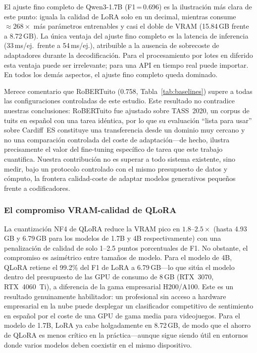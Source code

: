 \documentclass[conference]{IEEEtran}
\begin{document}
El ajuste fino completo de Qwen3-1.7B (F1\,=\,0.696) es la ilustración más clara
de este punto: iguala la calidad de LoRA solo en un decimal, mientras consume
$\approx\!268\times$ más parámetros entrenables y casi el doble de VRAM
(15.84\,GB frente a 8.72\,GB).
La única ventaja del ajuste fino completo es la latencia de inferencia
(33\,ms/ej.\ frente a 54\,ms/ej.), atribuible a la ausencia de sobrecoste de
adaptadores durante la decodificación.
Para el procesamiento por lotes en diferido esta ventaja puede ser irrelevante;
para una API en tiempo real puede importar.
En todos los demás aspectos, el ajuste fino completo queda dominado.

Merece comentario que RoBERTuito (0.758, Tabla~\ref{tab:baselines}) supere a
todas las configuraciones controladas de este estudio.
Este resultado no contradice nuestras conclusiones: RoBERTuito fue ajustado
sobre TASS~2020, un corpus de tuits en español con una tarea idéntica, por lo
que su evaluación ``lista para usar'' sobre Cardiff~ES constituye una
transferencia desde un dominio muy cercano y no una comparación controlada del
coste de adaptación---de hecho, ilustra precisamente el valor del fine-tuning
específico de tarea que este trabajo cuantifica.
Nuestra contribución no es superar a todo sistema existente, sino medir, bajo un
protocolo controlado con el mismo presupuesto de datos y cómputo, la frontera
calidad-coste de adaptar modelos generativos pequeños frente a codificadores.

\subsubsection*{El compromiso VRAM-calidad de QLoRA}

La cuantización NF4 de QLoRA reduce la VRAM pico en $1.8$--$2.5\times$ (hasta
4.93\,GB y 6.79\,GB para los modelos de 1.7B y 4B respectivamente) con una
penalización de calidad de solo 1--2.5 puntos porcentuales de F1.
No obstante, el compromiso es asimétrico entre tamaños de modelo.
Para el modelo de 4B, QLoRA retiene el 99.2\% del F1 de LoRA a 6.79\,GB---lo que
sitúa el modelo dentro del presupuesto de las GPU de consumo de 8\,GB
(RTX~3070, RTX~4060~Ti), a diferencia de la gama empresarial H200/A100.
Este es un resultado genuinamente habilitador: un profesional sin acceso a
hardware empresarial en la nube puede desplegar un clasificador competitivo de
sentimiento en español por el coste de una GPU de gama media para videojuegos.
Para el modelo de 1.7B, LoRA ya cabe holgadamente en 8.72\,GB, de modo que el
ahorro de QLoRA es menos crítico en la práctica---aunque sigue siendo útil en
entornos donde varios modelos deben coexistir en el mismo dispositivo.
\end{document}
